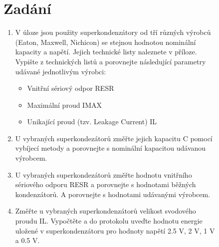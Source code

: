 \documentclass{article}
\begin{document}





\begin{figure}
  \begin{minipage}[t]{\textwidth}
    \section*{Zadání}
    \begin{enumerate}
    \item V úloze jsou použity superkondenzátory od tří různých výrobců (Eaton, Maxwell, Nichicon) se stejnou hodnotou nominální kapacity a napětí. Jejich technické listy naleznete v příloze. Vypište z technických listů a porovnejte následující parametry udávané jednotlivým výrobci:
    \begin{itemize}
      \item Vnitřní sériový odpor RESR
      \item Maximální proud IMAX
      \item Unikající proud (tzv. Leakage Current) IL
    \end{itemize}
    \item U vybraných superkondezátorů změřte jejich kapacitu C pomocí vybíjecí metody a porovnejte s nominální kapacitou udávanou výrobcem.
    \item U vybraných superkondezátorů změřte hodnotu vnitřního sériového odporu RESR a porovnejte s hodnotami běžných kondenzátorů. A porovnejte s hodnotami udávanými výrobcem.
    \item Změřte u vybraných superkondenzátorů velikost svodového proudu IL. Vypočtěte a do protokolu uveďte hodnotu energie uložené v superkondenzátoru pro hodnoty napětí 2.5 V, 2 V, 1 V a 0.5 V.
    \end{enumerate}
  \end{minipage}
    

\end{figure}
\end{document}
